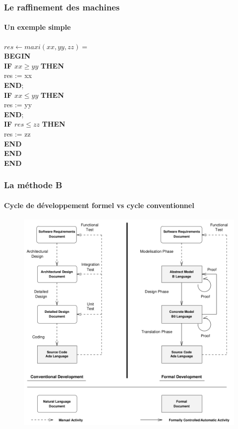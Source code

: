 \documentclass[11pt,a4paper,xcolor=table]{beamer} %
\begin{document}
\begin{frame}
\frametitle{Le raffinement des machines}
\framesubtitle{Un exemple simple}
$res \leftarrow maxi ( xx , yy , zz ) = $ \\
\hspace*{1em}    \textbf{BEGIN} \\
\hspace*{1em}    \textbf{IF} $xx \geq yy$ \textbf{THEN} \\
\hspace*{2em}        res := xx \\
\hspace*{1em}    \textbf{END}; \\
\hspace*{1em}   \textbf{IF} $xx \leq yy$  \textbf{THEN} \\
\hspace*{2em}        res := yy \\
\hspace*{1em}    \textbf{END}; \\
\hspace*{1em}   \textbf{IF} $res \leq zz$ \textbf{THEN} \\
\hspace*{2em}        res := zz \\
\hspace*{1em}    \textbf{END} \\
\hspace*{1em}    \textbf{END} \\
\textbf{END}
\end{frame}

\begin{frame}
\frametitle{La méthode B}
\framesubtitle{Cycle de développement formel vs cycle conventionnel}
\begin{figure}[h]
\centering
\includegraphics[scale=0.22]{ressources/formal_dev.png}
\end{figure}
\end{frame}
\end{document}
